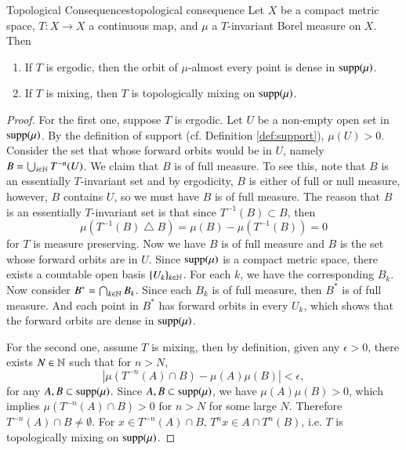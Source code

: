\documentclass[12pt,a4paper]{article}
\begin{document}
	
	\begin{proposition}{Topological Consequences}{topological consequence}
		Let $X$ be a compact metric space, $T:X\rightarrow X$ a continuous map, and $\mu$ a $T$-invariant Borel measure on $X$. Then
		\begin{enumerate}
			\item If $T$ is ergodic, then the orbit of $\mu$-almost every point is dense in $\text{supp}(\mu)$.
			\item If $T$ is mixing, then $T$ is topologically mixing on $\text{supp}(\mu)$.
		\end{enumerate}
	\end{proposition}
	\begin{proof}
		For the first one, suppose $T$ is ergodic. Let $U$ be a non-empty open set in $\text{supp}(\mu)$. By the definition of support (cf. Definition \ref{def:support}), $\mu(U)>0$. Consider the set that whose forward orbits would be in $U$, namely
		$B=\bigcup_{i\in \mathbb{N}}T^{-n}(U)$. We claim that $B$ is of full measure. To see this, note that $B$ is an essentially $T$-invariant set and by ergodicity, $B$ is either of full or null measure, however, $B$ contains $U$, so we must have $B$ is of full measure. The reason that $B$ is an essentially $T$-invariant set is that since $T^{-1}(B)\subset B$, then $$\mu(T^{-1}(B)\bigtriangleup B)=\mu(B)-\mu(T^{-1}(B))=0$$ for $T$ is measure preserving. Now we have $B$ is of full measure and $B$ is the set whose forward orbits are in $U$. Since $\text{supp}(\mu)$ is a compact metric space, there exists a countable open basis $\{U_k\}_{k\in \mathbb{N}}$. For each $k$, we have the corresponding $B_k$. Now consider $B^*=\bigcap_{k\in\mathbb{N}} B_k$. Since each $B_k$ is of full measure, then $B^*$ is of full measure. And each point in $B^*$ has forward orbits in every $U_k$, which shows that the forward orbits are dense in $\text{supp}(\mu)$.
		
		For the second one, assume $T$ is mixing, then by definition, given any $\epsilon>0$, there exists $N\in\mathbb{N}$ such that for $n>N$,
		$$
		|\mu(T^{-n}(A)\cap B)-\mu(A)\mu(B)|<\epsilon,
		$$
		for any $A,B\subset \text{supp}(\mu)$. Since $A,B\subset \text{supp}(\mu)$, we have $\mu(A)\mu(B)>0$, which implies $\mu(T^{-n}(A)\cap B)>0$ for $n>N$ for some large $N$. Therefore $T^{-n}(A)\cap B\neq \emptyset$. For $x\in T^{-n}(A)\cap B$, $T^nx\in A\cap T^{n}(B)$, i.e. $T$ is topologically mixing on $\text{supp}(\mu)$.
	\end{proof}
	
	
	\newcommand{\C}{\mathbb{C}}
\end{document}

